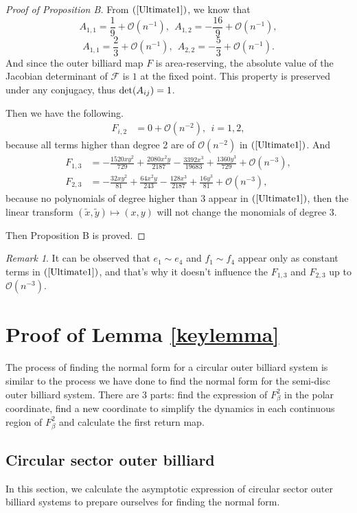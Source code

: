 \documentclass{article}
\numberwithin{figure}{section}
\numberwithin{equation}{section}
\theoremstyle{remark}
\newtheorem*{remark}{Remark}
\theoremstyle{definition}
\begin{document}
\begin{proof}[Proof of Proposition B]
    
    From $(\ref{Ultimate1})$, we know that
    \[A_{1,1} = \frac{1}{9}+\mathcal{ O}\left( n^{- 1} \right),\ \ A_{1,2} = - \frac{16}{9}+\mathcal{O}\left( n^{- 1} \right),\]
\[A_{1,1} = \frac{2}{3}+\mathcal{ O}\left( n^{- 1} \right),\ \ A_{2,2} = - \frac{5}{3}+\mathcal{O}\left( n^{- 1} \right).\]
And since the outer billiard map $F$ is area-reserving, the absolute value of the Jacobian determinant of $\mathcal{F}$ is $1$ at the fixed point. This property is preserved under any conjugacy, thus ${\rm det}(A_{ij})=1$.  

Then we have the following.
\begin{align*}
      F_{i,2}&=0+\mathcal{O}\left(n^{-2}\right),\ \ i=1,2,
      \end{align*}
because all terms higher than degree 2 are of $\mathcal{O}(n^{-2})$ in $(\ref{Ultimate1})$. And 
\begin{align*}
      F_{1,3}&=-\frac{1520xy^2 }{729}+\frac{2080{x}^2 {y}}{2187}-\frac{3392{x}^3 }{19683}+\frac{1360{y}^3 }{729}+\mathcal{O}\left(n^{-3}\right),\\
      F_{2,3}&=-\frac{32{x}{y}^2 }{81}+\frac{64{x}^2 {y}}{243}-\frac{128{x}^3 }{2187}+\frac{16{y}^3 }{81}+\mathcal{O}\left(n^{-3}\right),
\end{align*}
because no polynomials of degree higher than 3 appear in $(\ref{Ultimate1})$, then the linear transform $(\tilde{x},\tilde{y})\mapsto (x,y)$ will not change the monomials of degree 3.

Then Proposition B is proved.
\end{proof}
\begin{remark}
    It can be observed that $e_1\sim e_4$ and $f_1\sim f_4$ appear only as constant terms in $(\ref{Ultimate1})$, and that's why it doesn't influence the $F_{1,3}$ and $F_{2,3}$ up to $\mathcal{O}(n^{-3})$.
\end{remark}


\section{Proof of Lemma \ref{keylemma}}\label{proof of key lemma}
The process of finding the normal form for a circular outer billiard system is similar to the process we have done to find the normal form for the semi-disc outer billiard system. There are 3 parts: find the expression of $F_\beta^2$ in the polar coordinate, find a new coordinate to simplify the dynamics in each continuous region of $F_\beta^2$ and calculate the first return map.
\subsection{Circular sector outer billiard}
In this section, we calculate the asymptotic expression of circular sector outer billiard systems to prepare ourselves for finding the normal form.
\end{document}

